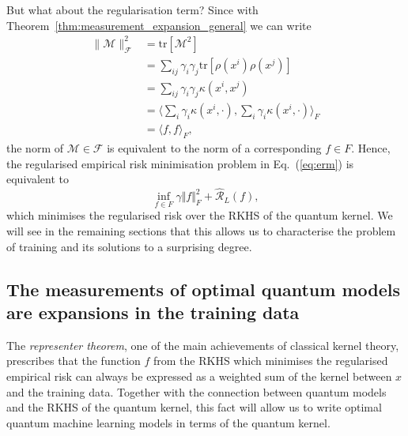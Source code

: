 \documentclass[aps, reprint, onecolumn, nofootinbib, longbibliography]{revtex4-2}
\newcommand{\tr}[1]{ \mathrm{tr}\left[#1\right] }
\newcommand{\meas}{\mathcal{M}}
\begin{document}
But what about the regularisation term? Since with Theorem~\ref{thm:measurement_expansion_general} we can write
\begin{align}
 \| \meas \|^2_{\mathcal{F}}  &= \tr{\meas^2} \\
 &= \sum_{ij} \gamma_i \gamma_j \tr{\rho(x^i)\rho(x^j)}\\
&= \sum_{ij} \gamma_i \gamma_j \kappa(x^i, x^j) \\
&=  \langle \sum_{i} \gamma_i \kappa(x^i, \cdot), \sum_{i} \gamma_i \kappa(x^i, \cdot) \rangle_{F}\\
&=\langle f, f \rangle_{F},
\end{align}
the norm of $\meas \in \mathcal{F}$ is equivalent to the norm of a corresponding $f \in {F}$. Hence, the regularised empirical risk minimisation problem in Eq.~(\ref{eq:erm}) is equivalent to  
\begin{equation}\label{eq:erm2}
    \inf_{f \in F } \gamma  \Vert f \Vert^2_{F} + \hat{\mathcal{R}}_L(f),
\end{equation}
which minimises the regularised risk over the RKHS of the quantum kernel. We will see in the remaining sections that this allows us to characterise the problem of training and its solutions to a surprising degree.

\subsection{The measurements of optimal quantum models are expansions in the training data}\label{ssec:meas_expansion}

The \textit{representer theorem}, one of the main achievements of classical kernel theory, prescribes that the function $f$ from the RKHS which minimises the regularised empirical risk can always be expressed as a weighted sum of the kernel between $x$ and the training data. Together with the connection between quantum models and the RKHS of the quantum kernel, this fact will allow us to write optimal quantum machine learning models in terms of the quantum kernel.
\end{document}
